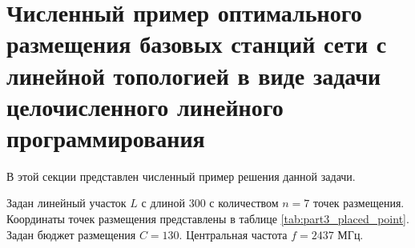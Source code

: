 







\section{Численный пример оптимального размещения базовых станций сети с линейной топологией в виде задачи целочисленного линейного программирования}\label{part4:ilp_solution}

В этой секции представлен численный пример решения данной задачи.

Задан линейный участок $L$ с длиной 300 с количеством $n=7$ точек размещения. Координаты точек размещения представлены в таблице \cref{tab:part3_placed_point}.  Задан бюджет размещения $C=130$. Центральная частота $f = 2437$ МГц. 

